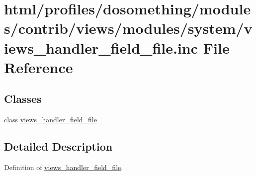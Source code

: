 \hypertarget{views__handler__field__file_8inc}{
\section{html/profiles/dosomething/modules/contrib/views/modules/system/views\_\-handler\_\-field\_\-file.inc File Reference}
\label{views__handler__field__file_8inc}
}
\subsection*{Classes}
\begin{DoxyCompactItemize}
\item 
class \hyperlink{classviews__handler__field__file}{views\_\-handler\_\-field\_\-file}
\end{DoxyCompactItemize}


\subsection{Detailed Description}
Definition of \hyperlink{classviews__handler__field__file}{views\_\-handler\_\-field\_\-file}. 